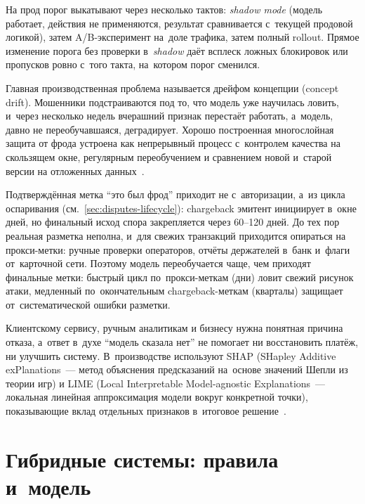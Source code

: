 На прод порог выкатывают через несколько тактов: \textit{shadow mode}
(модель работает, действия не применяются, результат сравнивается
с~текущей продовой логикой), затем A/B-эксперимент на~доле трафика,
затем полный rollout. Прямое изменение порога без проверки
в~\textit{shadow} даёт всплеск ложных блокировок или пропусков
ровно с~того такта, на~котором порог сменился.

Главная производственная проблема называется дрейфом концепции
(concept drift).
Мошенники подстраиваются под то, что модель уже научилась ловить,
и~через несколько недель вчерашний признак перестаёт работать, а~модель,
давно не переобучавшаяся, деградирует. Хорошо построенная многослойная
защита от фрода устроена как непрерывный процесс с~контролем качества
на скользящем окне, регулярным переобучением и сравнением новой и~старой
версии на отложенных данных~\cite{concept-drift-survey-2014}.

Подтверждённая метка \enquote{это был фрод} приходит не с~авторизации,
а~из цикла оспаривания (см.~\autoref{sec:disputes-lifecycle}): chargeback
эмитент инициирует в~окне дней, но финальный исход спора закрепляется
через 60--120 дней. До тех пор реальная разметка неполна, и~для свежих
транзакций приходится опираться на прокси-метки: ручные проверки
операторов, отчёты держателей в~банк и~флаги от~карточной сети.
Поэтому модель переобучается чаще, чем приходят финальные метки:
быстрый цикл по~прокси-меткам (дни) ловит свежий рисунок атаки,
медленный по~окончательным chargeback-меткам (кварталы) защищает
от~систематической ошибки разметки.

Клиентскому сервису, ручным аналитикам и бизнесу нужна понятная
причина отказа, а~ответ в~духе \enquote{модель сказала нет}
не помогает ни восстановить платёж, ни улучшить систему.
В~производстве используют SHAP (SHapley Additive exPlanations~---
метод объяснения предсказаний на~основе значений Шепли из теории игр)
и LIME (Local Interpretable Model-agnostic Explanations~--- локальная
линейная аппроксимация модели вокруг конкретной точки),
показывающие вклад отдельных признаков в~итоговое
решение~\cite{lime-2016,shap-2017}.

\section{Гибридные системы: правила и~модель}\label{sec:fraud-hybrid}

